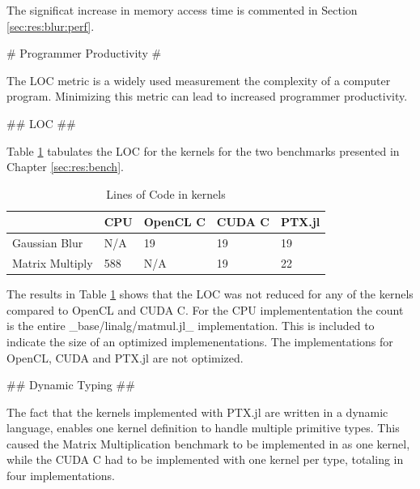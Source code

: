 \begin{markdown}
The significat increase in memory access time is commented in
Section \ref{sec:res:blur:perf}.

# Programmer Productivity #
\label{sec:res:productivity}

The \gls{LOC} metric is a widely used measurement the complexity of a
computer program. Minimizing this metric can lead to increased
programmer productivity. 

## LOC ##
\label{sec:res:loc}

Table \ref{tab:loc} tabulates the LOC for the kernels for the two
benchmarks presented in Chapter \ref{sec:res:bench}.

\begin{table}[H]
  \centering
  \begin{tabular}{|l|l|l|l|l|}
    \hline
    & \textbf{CPU} & \textbf{OpenCL C} & \textbf{CUDA C} & \textbf{PTX.jl} \\
    \hline
    Gaussian Blur   & N/A & 19       & 19     & 19 \\
    \hline
    Matrix Multiply & 588 & N/A      & 19     & 22 \\
    \hline
  \end{tabular}
  \caption{Lines of Code in kernels}
  \label{tab:loc}
\end{table}

The results in Table \ref{tab:loc} shows that the LOC was not reduced
for any of the kernels compared to OpenCL and CUDA C. For the CPU
implemententation the count is the entire _base/linalg/matmul.jl_
implementation. This is included to indicate the size of an optimized
implemenentations. The implementations for OpenCL, CUDA and PTX.jl are
not optimized.

## Dynamic Typing ##

The fact that the kernels implemented with PTX.jl are written in a
dynamic language, enables one kernel definition to handle multiple
primitive types. This caused the Matrix Multiplication benchmark to be
implemented in as one kernel, while the CUDA C had to be implemented
with one kernel per type, totaling in four implementations.

\end{markdown}
